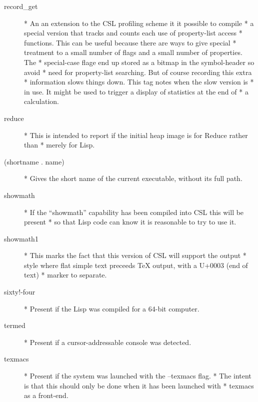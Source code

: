 \documentclass[a4paper,11pt]{article}
\begin{document}
\begin{description}
\item[{\ttfamily  record\_get}] 
      * An an extension to the CSL profiling scheme it it possible to compile
      * a special version that tracks and counts each use of property-list access
      * functions. This can be useful because there are ways to give special
      * treatment to a small number of flags and a small number of properties. The
      * special-case flage end up stored as a bitmap in the symbol-header so avoid
      * need for property-list searching. But of course recording this extra
      * information slows things down. This tag notes when the slow version is
      * in use. It might be used to trigger a display of statistics at the end of
      * a calculation.

\item[{\ttfamily reduce}] 
      * This is intended to report if the initial heap image is for Reduce rather than
      * merely for Lisp.

\item[{\ttfamily  (shortname . name)}] 
      * Gives the short name of the current executable, without its full path.

\item[{\ttfamily showmath}] 
      * If the ``showmath'' capability has been compiled into CSL this will be present
      * so that Lisp code can know it is reasonable to try to use it.

\item[{\ttfamily showmath1}] 
      * This marks the fact that this version of CSL will support the output
      * style where flat simple text preceeds TeX output, with a U+0003 (end of text)
      * marker to separate.

\item[{\ttfamily  sixty!-four}] 
      * Present if the Lisp was compiled for a 64-bit computer.

\item[{\ttfamily termed}] 
      * Present if a cursor-addressable console was detected.

\item[{\ttfamily texmacs}] 
      * Present if the system was launched with the {\ttfamily --texmacs} flag.
      * The intent is that this should only be done when it has been launched with
      * texmacs as a front-end.


\end{description}
\end{document}

